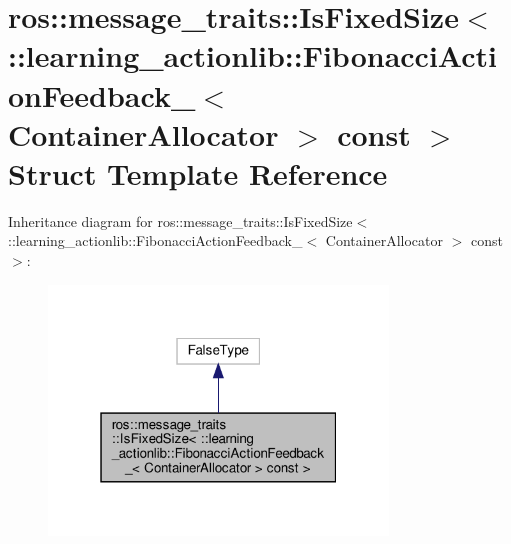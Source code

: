 \hypertarget{structros_1_1message__traits_1_1IsFixedSize_3_01_1_1learning__actionlib_1_1FibonacciActionFeedbae09c50341c1cafefe32cc32f96c0bf54}{}\section{ros\+:\+:message\+\_\+traits\+:\+:Is\+Fixed\+Size$<$ \+:\+:learning\+\_\+actionlib\+:\+:Fibonacci\+Action\+Feedback\+\_\+$<$ Container\+Allocator $>$ const $>$ Struct Template Reference}
\label{structros_1_1message__traits_1_1IsFixedSize_3_01_1_1learning__actionlib_1_1FibonacciActionFeedbae09c50341c1cafefe32cc32f96c0bf54}


Inheritance diagram for ros\+:\+:message\+\_\+traits\+:\+:Is\+Fixed\+Size$<$ \+:\+:learning\+\_\+actionlib\+:\+:Fibonacci\+Action\+Feedback\+\_\+$<$ Container\+Allocator $>$ const $>$\+:
\nopagebreak
\begin{figure}[H]
\begin{center}
\leavevmode
\includegraphics[width=256pt]{structros_1_1message__traits_1_1IsFixedSize_3_01_1_1learning__actionlib_1_1FibonacciActionFeedbac76a8c2691cc39223b7bd769681cce49}
\end{center}
\end{figure}


